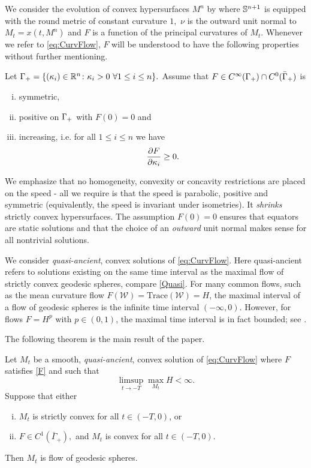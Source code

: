 \documentclass{amsart}
\begin{document}
We consider the evolution of convex hypersurfaces $M^n$ by
where \(\S^{n+1}\) is equipped with the round metric of constant curvature $1,$ $\nu$ is the outward unit normal to $M_t=x(t,M^n)$ and $F$ is a function of the principal curvatures of $M_t.$ Whenever we refer to \eqref{eq:CurvFlow}, $F$ will be understood to have the following properties without further mentioning.
\begin{ass} \label{F}
Let $\G_{+}=\{(\k_i)\in\R^n\cn \k_i>0~\forall 1\leq i\leq n\}.$ Assume that $F\in C^{\8}(\G_{+}) \cap C^{0}(\-\G_{+})$ is
\begin{enumerate}[(i)]
\item{symmetric},
\item{positive on $\G_{+}$ with $F(0)=0$}  and
\item{increasing, i.e. for all $1\leq i\leq n$ we have
\[\fr{\del F}{\del \k_i}\geq 0.\]}
\end{enumerate}
\end{ass}
We emphasize that no homogeneity, convexity or concavity restrictions are placed on the speed - all we require is that the speed is parabolic, positive and symmetric (equivalently, the speed is invariant under isometries). It \emph{shrinks} strictly convex hypersurfaces. The assumption $F(0)=0$ ensures that equators are static solutions and that the choice of an \emph{outward} unit normal makes sense for all nontrivial solutions.

We consider \emph{quasi-ancient}, convex solutions of \eqref{eq:CurvFlow}. Here quasi-ancient refers to solutions existing on the same time interval as the maximal flow of strictly convex geodesic spheres, compare \cref{Quasi}. For many common flows, such as the mean curvature flow \(F(\mathcal{W}) = \text{Trace}(\mathcal{W}) = H\), the maximal interval of a flow of geodesic spheres is the infinite time interval \((-\infty, 0)\). However, for flows \(F = H^p\) with \(p \in (0,1)\), the maximal time interval is in fact bounded; see .

The following theorem is the main result of the paper.
\begin{thm}
\label{thm:main}
Let \(M_t\) be a smooth, \emph{quasi-ancient}, convex solution of \eqref{eq:CurvFlow} where $F$ satisfies \cref{F} and such that
\[\limsup_{t\rightarrow -T}\max_{M_t}H<\infty.\] Suppose that either
\begin{enumerate}[(i)]
\item\label{main1} $M_t$ is strictly convex for all $t \in (-T, 0)$, or
\item \label{main2}$F\in C^1(\bar\Gamma_{+}),$ and $M_t$ is convex for all $t \in (-T, 0)$.
\end{enumerate}
\noindent
Then $M_t$ is flow of geodesic spheres.
\end{thm}
\end{document}
